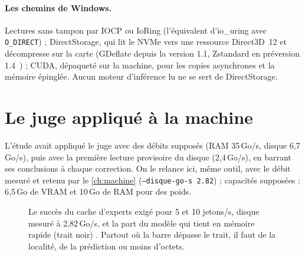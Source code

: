 \paragraph{Les chemins de Windows.} Lectures sans tampon par IOCP ou IoRing (l'équivalent d'io\_uring avec \texttt{O\_DIRECT}) ; DirectStorage, qui lit le NVMe vers une ressource Direct3D~12 et décompresse sur la carte (GDeflate depuis la version 1.1, Zstandard en préversion 1.4~\cite{microsoft2026directstorage14}) ; CUDA, dépaqueté sur la machine, pour les copies asynchrones et la mémoire épinglée. Aucun moteur d'inférence lu ne se sert de DirectStorage.

\section{Le juge appliqué à la machine}\label{sec:juge}

L'étude avait appliqué le juge avec des débits supposés (RAM 35\,Go/s, disque 6,7\,Go/s), puis avec la première lecture provisoire du disque (2,4\,Go/s), en barrant ses conclusions à chaque correction. On le relance ici, même outil, avec le débit mesuré et retenu par le \cref{ch:machine} (\texttt{--disque-go-s 2.82}) ; capacités supposées : 6,5\,Go de VRAM et 10\,Go de RAM pour des poids.

\begin{figure}[ht]
\centering
\GrapheJuge
\caption[Le succès du cache exigé, modèle par modèle]{Le succès du cache d'experts exigé pour 5 et 10 jetons/s, disque mesuré à 2,82\,Go/s, et la part du modèle qui tient en mémoire rapide (trait noir) \calc. Partout où la barre dépasse le trait, il faut de la localité, de la prédiction ou moins d'octets.}
\label{fig:juge}
\end{figure}

\begin{table}[ht]
\centering\small
\caption[Le juge sur la machine, disque à 2,4 puis 2,82\,Go/s]{Le juge sur la machine : borne sans localité et succès exigé, disque à 2,4\,Go/s (étude 04) puis 2,82\,Go/s (mesure retenue) \calc.}
\label{tab:juge}
\end{table}

